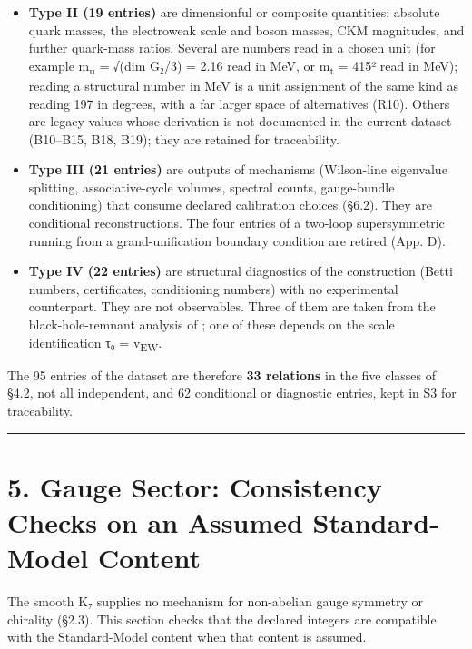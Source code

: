 \documentclass[11pt,a4paper]{article}
\begin{document}
\begin{itemize}
\tightlist
\item
  \textbf{Type II (19 entries)} are dimensionful or composite quantities: absolute quark masses, the electroweak scale and boson masses, CKM magnitudes, and further quark-mass ratios. Several are numbers read in a chosen unit (for example m\textsubscript{u} = √(dim G₂/3) = 2.16 read in MeV, or m\textsubscript{t} = 415² read in MeV); reading a structural number in MeV is a unit assignment of the same kind as reading 197 in degrees, with a far larger space of alternatives (R10). Others are legacy values whose derivation is not documented in the current dataset (B10--B15, B18, B19); they are retained for traceability.
\item
  \textbf{Type III (21 entries)} are outputs of mechanisms (Wilson-line eigenvalue splitting, associative-cycle volumes, spectral counts, gauge-bundle conditioning) that consume declared calibration choices (§6.2). They are conditional reconstructions. The four entries of a two-loop supersymmetric running from a grand-unification boundary condition are retired (App. D).
\item
  \textbf{Type IV (22 entries)} are structural diagnostics of the construction (Betti numbers, certificates, conditioning numbers) with no experimental counterpart. They are not observables. Three of them are taken from the black-hole-remnant analysis of \cite{42}; one of these depends on the scale identification τ₀ = v\textsubscript{EW}.
\end{itemize}

The 95 entries of the dataset are therefore \textbf{33 relations} in the five classes of §4.2, not all independent, and 62 conditional or diagnostic entries, kept in S3 for traceability.

\begin{center}\rule{\linewidth}{0.5pt}\end{center}

\section{5. Gauge Sector: Consistency Checks on an Assumed Standard-Model Content}\label{gauge-sector-consistency-checks-on-an-assumed-standard-model-content}

The smooth K₇ supplies no mechanism for non-abelian gauge symmetry or chirality (§2.3). This section checks that the declared integers are compatible with the Standard-Model content when that content is assumed.
\end{document}
